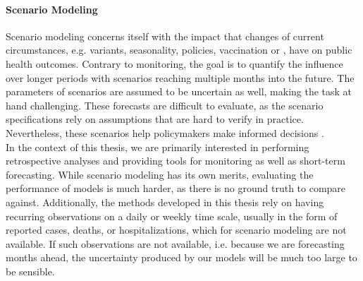 \paragraph{Scenario Modeling}
Scenario modeling concerns itself with the impact that changes of current circumstances, e.g. variants, seasonality, policies, vaccination or , have on public health outcomes. Contrary to monitoring, the goal is to quantify the influence over longer periods with scenarios reaching multiple months into the future. The parameters of scenarios are assumed to be uncertain as well, making the task at hand challenging. These forecasts are difficult to evaluate, as the scenario specifications rely on assumptions that are hard to verify in practice. Nevertheless, these scenarios help policymakers make informed decisions \citep{Borchering2023Public}.\\[20pt]
In the context of this thesis, we are primarily interested in performing retrospective analyses and providing tools for monitoring as well as short-term forecasting. While scenario modeling has its own merits, evaluating the performance of models is much harder, as there is no ground truth to compare against. Additionally, the methods developed in this thesis rely on having recurring observations on a daily or weekly time scale, usually in the form of reported cases, deaths, or hospitalizations, which for scenario modeling are not available. If such observations are not available, i.e. because we are forecasting months ahead, the uncertainty produced by our models will be much too large to be sensible. 

